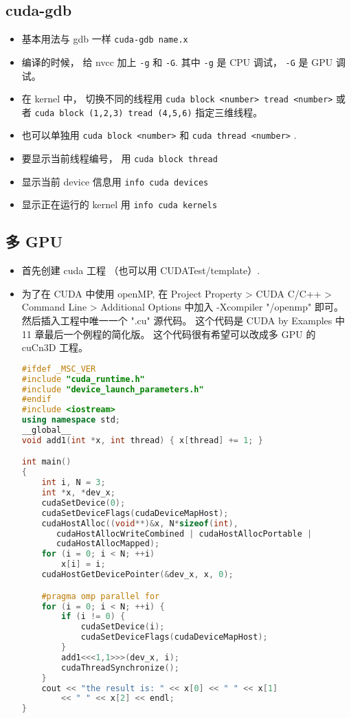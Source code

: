\subsection{cuda-gdb}
\begin{itemize}
\item 基本用法与 gdb 一样 \verb|cuda-gdb name.x|
\item 编译的时候， 给 nvcc 加上 \verb`-g` 和 \verb`-G`. 其中 \verb`-g` 是 CPU 调试， \verb`-G` 是 GPU 调试。
\item 在 kernel 中， 切换不同的线程用
\verb`cuda block <number> tread <number>` 或者 \verb`cuda block (1,2,3) tread (4,5,6)` 指定三维线程。
\item 也可以单独用 \verb`cuda block <number>` 和 \verb`cuda thread <number>` .
\item 要显示当前线程编号， 用 \verb`cuda block thread`
\item 显示当前 device 信息用 \verb`info cuda devices`
\item 显示正在运行的 kernel 用 \verb`info cuda kernels`
\end{itemize}

\subsection{多 GPU}
\begin{itemize}
\item 首先创建 cuda 工程 （也可以用 CUDATest/template）.
\item 为了在 CUDA 中使用 openMP, 在 Project Property > CUDA C/C++ > Command Line > Additional Options 中加入 -Xcompiler "/openmp" 即可。 然后插入工程中唯一一个 ".cu" 源代码。 这个代码是 CUDA by Examples 中 11 章最后一个例程的简化版。 这个代码很有希望可以改成多 GPU 的 cuCn3D 工程。
\begin{lstlisting}[language=cpp]
#ifdef _MSC_VER
#include "cuda_runtime.h"
#include "device_launch_parameters.h"
#endif
#include <iostream>
using namespace std;
__global__
void add1(int *x, int thread) { x[thread] += 1; }

int main()
{
	int i, N = 3;
	int *x, *dev_x;
	cudaSetDevice(0);
	cudaSetDeviceFlags(cudaDeviceMapHost);
	cudaHostAlloc((void**)&x, N*sizeof(int),
       cudaHostAllocWriteCombined | cudaHostAllocPortable | 
       cudaHostAllocMapped);
	for (i = 0; i < N; ++i)
		x[i] = i;
	cudaHostGetDevicePointer(&dev_x, x, 0);

	#pragma omp parallel for
	for (i = 0; i < N; ++i) {
		if (i != 0) {
			cudaSetDevice(i);
			cudaSetDeviceFlags(cudaDeviceMapHost);
		}
		add1<<<1,1>>>(dev_x, i);
		cudaThreadSynchronize();
	}
	cout << "the result is: " << x[0] << " " << x[1]
        << " " << x[2] << endl;
}
\end{lstlisting}
\end{itemize}
